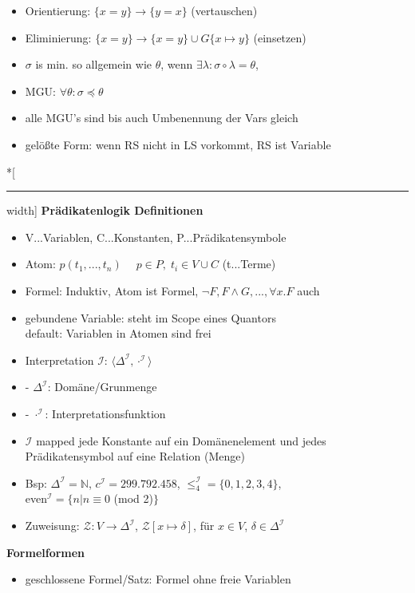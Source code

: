 \documentclass[12pt,a4paper]{article}
\begin{document}
\begin{paracol}{3}
\begin{itemize}
\item Orientierung: $\{x=y\} \rightarrow \{y=x\}$ (vertauschen)
\item Eliminierung: $\{x=y\} \rightarrow \{x=y\} \cup G\{x\mapsto y\}$ (einsetzen)
\item $\sigma$ is min. so allgemein wie $\theta$, wenn $\exists \lambda: \sigma \circ \lambda = \theta$,
\item MGU: $\forall \theta: \sigma \preceq \theta$
\item alle MGU's sind bis auch Umbenennung der Vars gleich
\item gelößte Form: wenn RS nicht in LS vorkommt, RS ist Variable
\end{itemize}
\switchcolumn[0]*[\hrule width\textwidth]
\centering
\textbf{Prädikatenlogik Definitionen}
\flushleft
\begin{itemize}
\setlength\itemsep{-0.5em}
\item V...Variablen, C...Konstanten, P...Prädikatensymbole
\item Atom: $p(t_1,...,t_n)\;\quad p\in P,\; t_i\in V\cup C$ (t...Terme)
\item Formel: Induktiv, Atom ist Formel, $\lnot F, F\land G,..., \forall x.F$ auch
\item gebundene Variable: steht im Scope eines Quantors\\default: Variablen in Atomen sind frei
\item Interpretation $\mathcal{I}$: $\langle \Delta^\mathcal{I}, \cdot^\mathcal{I} \rangle$
\item -  $\Delta^\mathcal{I}$: Domäne/Grunmenge
\item -  $\cdot^\mathcal{I}$: Interpretationsfunktion
\item $\mathcal{I}$ mapped jede Konstante auf ein Domänenelement und jedes Prädikatensymbol auf eine Relation (Menge)
\item Bsp: $\Delta^\mathcal{I} = \mathbb{N}$, $c^\mathcal{I}=299.792.458$, $\leq_4^\mathcal{I} = \{0,1,2,3,4\}$,\\even$^\mathcal{I} = \{n|n \equiv 0 $ (mod 2)$\}$
\item Zuweisung: $\mathcal{Z}: V \rightarrow \Delta^\mathcal{I}$, $\mathcal{Z}[x\mapsto \delta]$, für $x\in V$, $\delta \in \Delta^\mathcal{I}$
\end{itemize}
\switchcolumn[1]
\centering
\textbf{Formelformen}
\flushleft
\begin{itemize}
\setlength\itemsep{-0.5em}
\item geschlossene Formel/Satz: Formel ohne freie Variablen

\end{itemize}
\end{paracol}
\end{document}
